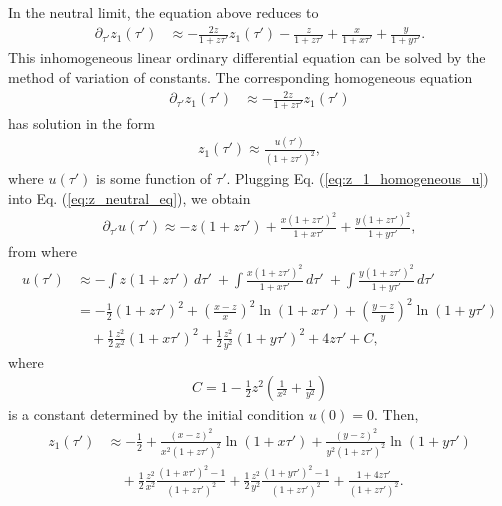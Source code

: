 \documentclass[11pt]{article}
\begin{document}
In the neutral limit, the equation above reduces to
\begin{align}\label{eq:z_neutral_eq}
    \partial_{\tau'}z_1(\tau') &\approx - \frac{2z}{1+z\tau'}z_1(\tau') - \frac{z}{1+z\tau'} + \frac{x}{1+x\tau'} + \frac{y}{1+y\tau'}.
\end{align}
This inhomogeneous linear ordinary differential equation can be solved by the method of variation of constants. The corresponding homogeneous equation 
\begin{align}
    \partial_{\tau'}z_1(\tau') &\approx - \frac{2z}{1+z\tau'}z_1(\tau')
\end{align}
has solution in the form
\begin{align}\label{eq:z_1_homogeneous_u}
    z_1(\tau') \approx \frac{u(\tau')}{(1+z\tau')^2},
\end{align}
where $u(\tau')$ is some function of $\tau'$. Plugging Eq. (\ref{eq:z_1_homogeneous_u}) into Eq. (\ref{eq:z_neutral_eq}), we obtain
\begin{align}
    \partial_{\tau'} u(\tau') \approx - z(1+z\tau') + \frac{x(1+z\tau')^2}{1+x\tau'} + \frac{y(1+z\tau')^2}{1+y\tau'},
\end{align}
from where
\begin{align}
    u(\tau') &\approx - \int z(1+z\tau') \,d\tau'\
    + \int \frac{x(1+z\tau')^2}{1+x\tau'} \,d\tau'\
    + \int \frac{y(1+z\tau')^2}{1+y\tau'} \,d\tau'\, \\\nonumber
    &= - \frac{1}{2} (1+z\tau')^2 
    + \left(\frac{x-z}{x}\right)^2\ln(1+x\tau')
    + \left(\frac{y-z}{y}\right)^2\ln(1+y\tau') \\\nonumber
    &\quad + \frac{1}{2}\frac{z^2}{x^2}(1+x\tau')^2
    + \frac{1}{2}\frac{z^2}{y^2}(1+y\tau')^2
    + 4z\tau' + C,
\end{align}
where 
\begin{align}
    C = 1 - \frac{1}{2}z^2\left(\frac{1}{x^2} + \frac{1}{y^2}\right)
\end{align} is a constant determined by the initial condition $u(0)=0$. Then, 
\begin{align}\label{eq:z_1}
    z_1(\tau') &\approx - \frac{1}{2} 
    + \frac{(x-z)^2}{x^2(1+z\tau')^2}\ln(1+x\tau')
    + \frac{(y-z)^2}{y^2(1+z\tau')^2}\ln(1+y\tau') \\\nonumber
    &\quad + \frac{1}{2}\frac{z^2}{x^2}\frac{(1+x\tau')^2-1}{(1+z\tau')^2}
    + \frac{1}{2}\frac{z^2}{y^2}\frac{(1+y\tau')^2-1}{(1+z\tau')^2}
    + \frac{1+4z\tau'}{(1+z\tau')^2}.
\end{align}
\end{document}
